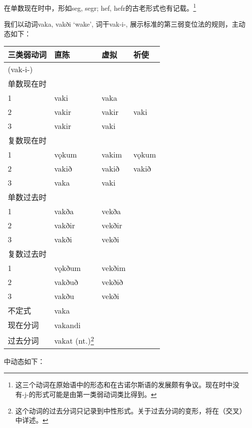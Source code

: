 在单数现在时中，形如seg, segr; hef, hefr的古老形式也有记载。\footnote{这三个动词在原始语中的形态和在古诺尔斯语的发展颇有争议。现在时中没有-j-的形式可能是由第一类弱动词类比得到。}

我们以动词vaka, vakði `wake‌', 词干vak-i-,
展示标准的第三弱变位法的规则，主动态如下：

\begin{longtable}{llll}
\toprule
三类弱动词 & 直陈 & 虚拟 & 祈使 \\
\midrule
\endhead
\bottomrule
\endfoot
(vak-i-) & & & \\
单数现在时 & & & \\
1 & vaki & vaka & \\
2 & vakir & vakir & vaki \\
3 & vakir & vaki & \\
复数现在时 & & & \\
1 & vǫkum & vakim & vǫkum \\
2 & vakið & vakið & vakið \\
3 & vaka & vaki & \\
单数过去时 & & & \\
1 & vakða & vekða & \\
2 & vakðir & vekðir & \\
3 & vakði & vekði & \\
复数过去时 & & & \\
1 & vǫkðum & vekðim & \\
2 & vakðuð & vekðið & \\
3 & vakðu & vekði & \\
不定式 & vaka & & \\
现在分词 & vakandi & & \\
过去分词 & vakat (nt.)\footnote{这个动词的过去分词只记录到中性形式。关于过去分词的变形，将在（交叉）中详述。}
& & \\
\end{longtable}

中动态如下：


